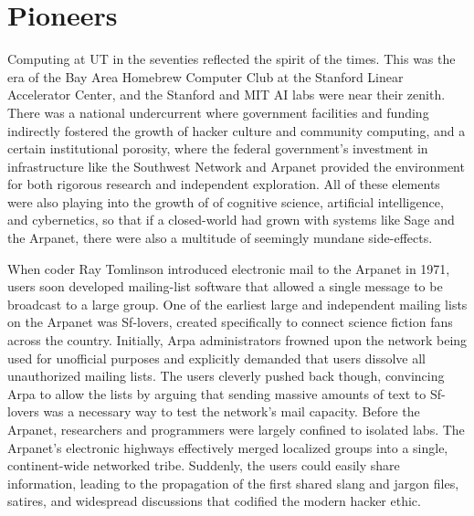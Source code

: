 \chapter{Pioneers}

Computing at UT in the seventies reflected the spirit of the times. This was the era of the Bay Area Homebrew Computer Club at the Stanford Linear Accelerator Center, and the Stanford and MIT AI labs were near their zenith. There was a national undercurrent where government facilities and funding indirectly fostered the growth of hacker culture and community computing, and a certain institutional porosity, where the federal government’s investment in infrastructure like the Southwest Network and Arpanet provided the environment for both rigorous research and independent exploration. All of these elements were also playing into the growth of of cognitive science, artificial intelligence, and cybernetics, so that if a closed-world had grown with systems like Sage and the Arpanet, there were also a multitude of seemingly mundane side-effects. \cite{edwardsClosedWorldComputers1996} 

When coder Ray Tomlinson introduced electronic mail to the Arpanet in 1971, users soon developed mailing-list software that allowed a single message to be broadcast to a large group. One of the earliest large and independent mailing lists on the Arpanet was Sf-lovers, created specifically to connect science fiction fans across the country. Initially, Arpa administrators frowned upon the network being used for unofficial purposes and explicitly demanded that users dissolve all unauthorized mailing lists. The users cleverly pushed back though, convincing Arpa to allow the lists by arguing that sending massive amounts of text to Sf-lovers was a necessary way to test the network's mail capacity. Before the Arpanet, researchers and programmers were largely confined to isolated labs. The Arpanet's electronic highways effectively merged localized groups into a single, continent-wide networked tribe. Suddenly, the users could easily share information, leading to the propagation of the first shared slang and jargon files, satires, and widespread discussions that codified the modern hacker ethic. \cite{sterlingShortHistoryInternet1992} \cite{hafnerWhereWizardsStay2006}

